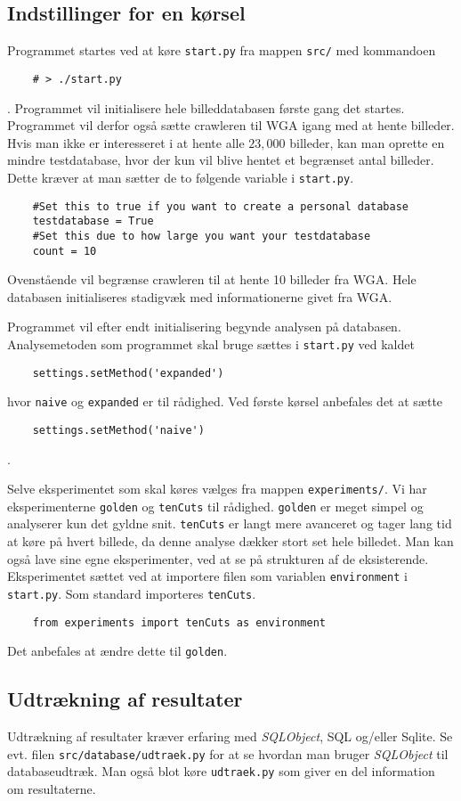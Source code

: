 {\subsection{Indstillinger for en kørsel}
Programmet startes ved at køre \texttt{start.py} fra mappen
\texttt{src/} med kommandoen
\begin{verbatim}
    # > ./start.py
\end{verbatim}.
Programmet vil initialisere hele billeddatabasen første gang det
startes. Programmet vil derfor også sætte crawleren til WGA igang med at
hente billeder. Hvis man ikke er interesseret i at hente alle $23,000$
billeder, kan man oprette en mindre testdatabase, hvor der kun vil blive
hentet et begrænset antal billeder. Dette kræver at man sætter de to
følgende variable i \texttt{start.py}.
\begin{verbatim}
    #Set this to true if you want to create a personal database
    testdatabase = True
    #Set this due to how large you want your testdatabase
    count = 10
\end{verbatim}
\label{brugervejl_test_db}
Ovenstående vil begrænse crawleren til at hente 10 billeder fra WGA.
Hele databasen initialiseres stadigvæk med informationerne givet fra
WGA.

Programmet vil efter endt initialisering begynde analysen på databasen.
Analysemetoden som programmet skal bruge sættes i \texttt{start.py} ved
kaldet
\begin{verbatim}
    settings.setMethod('expanded')
\end{verbatim}
hvor \texttt{naive} og \texttt{expanded} er til rådighed. Ved første
kørsel anbefales det at sætte
\begin{verbatim}
    settings.setMethod('naive')
\end{verbatim}.

Selve eksperimentet som skal køres vælges fra mappen
\texttt{experiments/}. Vi har eksperimenterne \texttt{golden} og
\texttt{tenCuts} til rådighed.  \texttt{golden} er meget simpel og
analyserer kun det gyldne snit.  \texttt{tenCuts} er langt mere
avanceret og tager lang tid at køre på hvert billede, da denne analyse
dækker stort set hele billedet. Man kan også lave sine egne
eksperimenter, ved at se på strukturen af de eksisterende. Eksperimentet
sættet ved at importere filen som variablen \texttt{environment} i
\texttt{start.py}. Som standard importeres \texttt{tenCuts}.
\begin{verbatim}
    from experiments import tenCuts as environment
\end{verbatim}
Det anbefales at ændre dette til \texttt{golden}.

\subsection{Udtrækning af resultater}
Udtrækning af resultater kræver erfaring med \emph{SQLObject}, SQL
og/eller Sqlite. Se evt. filen \texttt{src/database/udtraek.py} for
at se hvordan man bruger \emph{SQLObject} til databaseudtræk. Man også
blot køre \texttt{udtraek.py} som giver en del information om
resultaterne.

}

